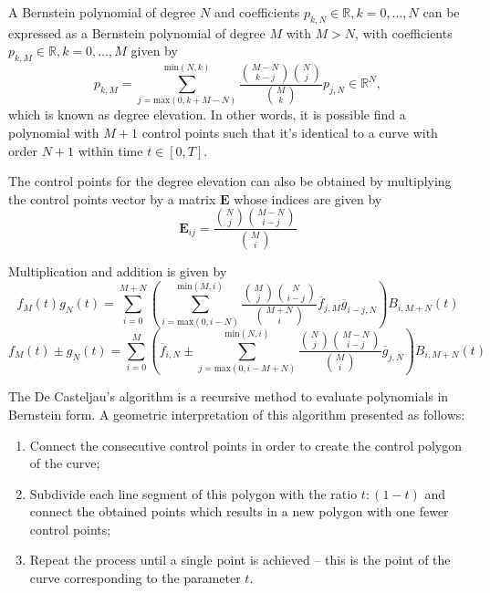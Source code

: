\par A Bernstein polynomial of degree $N$ and coefficients $p_{k,N}\in \mathbb{R}, k = 0,\dots,N$ can be expressed as a Bernstein polynomial of degree $M$ with $M>N$, with coefficients $p_{k,M} \in \mathbb{R}, k = 0,\dots,M$ given by 
\begin{equation}
    p_{k,M} = \sum_{j=\text{max}(0,k+M-N)}^{\text{min}(N,k)} \frac{{M-N \choose k-j}{N\choose j}}{{M\choose k}} p_{j,N} \in \mathbb{R}^N,
\end{equation}
which is known as degree elevation. In other words, it is possible find a polynomial with $M+1$ control points such that it's identical to a curve with order $N+1$ within time $t\in[0,T]$.
\par The control points for the degree elevation can also be obtained by multiplying the control points vector by a matrix $\boldsymbol{E}$ whose indices are given by 
\begin{equation}
    \label{eq:bernsteinelevindices}
    \boldsymbol{E}_{ij} = \frac{{N\choose j}{M-N\choose i-j}}{{M\choose i}}
\end{equation}

\par Multiplication and addition is given by
\begin{equation}
    \label{eq:bern_mul}
    f_M(t)g_N(t) = \sum^{M+N}_{i=0}  \left(\sum_{i=\text{max}(0,i-N)}^{\text{min}(M,i)} \frac{\binom{M}{j}\binom{N}{i-j}}{\binom{M+N}{i}} \overline{f}_{j,M}\overline{g}_{i-j,N}\right) B_{i,M+N}(t)
\end{equation}
\begin{equation}
    \label{eq:bern_sum}
    f_M(t)\pm g_N(t) = 
    \sum^{M}_{i=0}  \left(\overline{f}_{i,N} \pm \sum_{j=\text{max}(0,i-M+N)}^{\text{min}(N,i)} \frac{\binom{N}{j}\binom{M-N}{i-j}}{\binom{M}{i}} \overline{g}_{j,N}\right) B_{i,M+N}(t)
\end{equation}

\par The De Casteljau's algorithm \cite{shene2012finding} is a recursive method to evaluate polynomials in Bernstein form. A geometric interpretation of this algorithm presented as follows:
\begin{enumerate}
    \item Connect the consecutive control points in order to create the control polygon of the curve;
	\item Subdivide each line segment of this polygon with the ratio $t:(1-t)$ and connect the obtained points which results in a new polygon with one fewer control points;
    \item Repeat the process until a single point is achieved – this is the point of the curve corresponding to the parameter $t$.
\end{enumerate}

